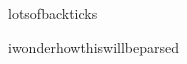 {\ttfamily lots}of{\ttfamily backticks}

{\ttfamily i}wonder{\ttfamily how}this{\ttfamily will}be{\ttfamily parsed} 